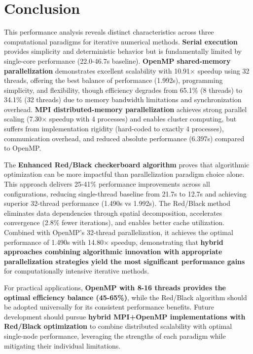 \documentclass[11pt]{article}
\begin{document}
\section*{Conclusion}

This performance analysis reveals distinct characteristics across three computational paradigms for iterative numerical methods. \textbf{Serial execution} provides simplicity and deterministic behavior but is fundamentally limited by single-core performance (22.0-46.7s baseline). \textbf{OpenMP shared-memory parallelization} demonstrates excellent scalability with 10.91× speedup using 32 threads, offering the best balance of performance (1.992s), programming simplicity, and flexibility, though efficiency degrades from 65.1\% (8 threads) to 34.1\% (32 threads) due to memory bandwidth limitations and synchronization overhead. \textbf{MPI distributed-memory parallelization} achieves strong parallel scaling (7.30× speedup with 4 processes) and enables cluster computing, but suffers from implementation rigidity (hard-coded to exactly 4 processes), communication overhead, and reduced absolute performance (6.397s) compared to OpenMP.

The \textbf{Enhanced Red/Black checkerboard algorithm} proves that algorithmic optimization can be more impactful than parallelization paradigm choice alone. This approach delivers 25-41\% performance improvements across all configurations, reducing single-thread baseline from 21.7s to 12.7s and achieving superior 32-thread performance (1.490s vs 1.992s). The Red/Black method eliminates data dependencies through spatial decomposition, accelerates convergence (2.8\% fewer iterations), and enables better cache utilization. Combined with OpenMP's 32-thread parallelization, it achieves the optimal performance of 1.490s with 14.80× speedup, demonstrating that \textbf{hybrid approaches combining algorithmic innovation with appropriate parallelization strategies yield the most significant performance gains} for computationally intensive iterative methods.

For practical applications, \textbf{OpenMP with 8-16 threads provides the optimal efficiency balance (45-65\%)}, while the Red/Black algorithm should be adopted universally for its consistent performance benefits. Future development should pursue \textbf{hybrid MPI+OpenMP implementations with Red/Black optimization} to combine distributed scalability with optimal single-node performance, leveraging the strengths of each paradigm while mitigating their individual limitations.
\end{document}

